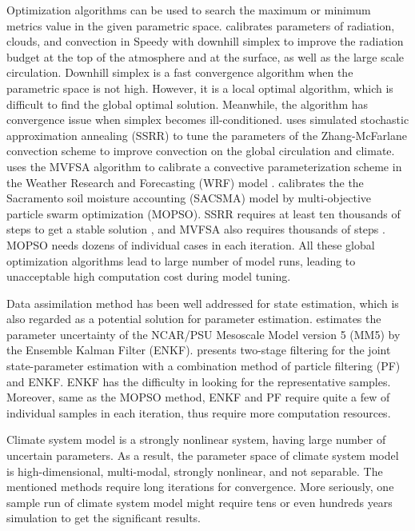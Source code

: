 \documentclass[gmd, manuscript]{copernicus}
\begin{document}
Optimization algorithms can be used to search the maximum or minimum metrics value in the given parametric space. \cite{severijns2005optimizing} calibrates parameters of radiation, clouds, and convection in Speedy with downhill simplex \citep{press1992numerical, nelder1965simplex} to improve the radiation budget at the top of the atmosphere and at the surface, as well as the large scale circulation. Downhill simplex is a fast convergence algorithm when the parametric space is not high. However, it is a local optimal algorithm, which is difficult to find the global optimal solution. Meanwhile, the algorithm has convergence issue when simplex becomes ill-conditioned. \cite{yang2013uncertainty} uses  simulated stochastic approximation annealing (SSRR) \citep{liang2013simulated} to tune the parameters of the Zhang-McFarlane convection scheme to improve convection on the global circulation and climate. \cite{yang2014calibration} uses the MVFSA algorithm to calibrate a convective parameterization scheme in the Weather Research and Forecasting (WRF) model \citep{michalakes2001development}. \cite{gill2006multiobjective} calibrates the the Sacramento soil moisture accounting
(SACSMA) model \citep{Burnash1973} by multi-objective particle swarm optimization (MOPSO). SSRR requires at least ten thousands of steps to get a stable solution \citep{liang2013simulated}, and MVFSA also requires thousands of steps \citep{jackson2004efficient}. MOPSO needs dozens of individual cases in each iteration. All these global optimization algorithms lead to large number of model runs, leading to unacceptable high computation cost during model tuning. 

Data assimilation method has been well addressed for state estimation, which is also regarded as a potential solution for parameter estimation. \cite{aksoy2006ensemble} estimates the parameter uncertainty of  the NCAR/PSU Mesoscale
Model version 5 (MM5) \citep{haagenson1994penn} by the Ensemble Kalman Filter (ENKF). \cite{santiti2013simulated} presents two-stage filtering for the joint state-parameter estimation with a combination method of particle filtering (PF) and ENKF.  ENKF has the difficulty in looking for the representative samples. Moreover, same as the MOPSO method, ENKF and PF require quite a few of individual samples in each iteration, thus require more computation resources. 


Climate system model is a strongly nonlinear system, having large number of uncertain parameters. As a result, the parameter space of climate system model is high-dimensional, multi-modal, strongly nonlinear, and not separable. The mentioned methods require long iterations for convergence. More seriously, one sample run of climate system model might require tens or even hundreds years simulation to get the significant results.
\end{document}
